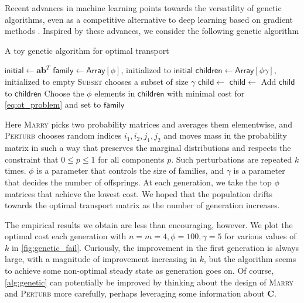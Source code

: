 \documentclass{article}
\renewcommand{\b}{\mathbf}
\theoremstyle{definition}
\theoremstyle{remark}
\begin{document}
Recent advances in machine learning points towards the versatility of genetic
 algorithms, even as a competitive alternative to deep learning based on
 gradient methods \cite{such2017deep}. Inspired by these advances, we consider
 the following genetic algorithm

\begin{algorithm}
\caption{A toy genetic algorithm for optimal transport}
\label{alg:genetic}

  \begin{algorithmic}
\Function{GeneticOT}{$\phi, \gamma, k, \b a, \b b, T$}
\State $\mathsf{initial} \gets \b a \b b^T$
\State $\mathsf{family} \gets \mathsf{Array}[\phi]$, initialized to $
\mathsf{initial}$
\State $\mathsf{children} \gets \mathsf{Array}[\phi\gamma]$, initialized to
 empty
       \Comment
{\textsc{Subset} chooses a subset of size $\gamma$}
\State $\mathsf{child} \gets$ 
\State $\mathsf{child} \gets$ 
\State Add $\mathsf{child}$ to $\mathsf{children}$
\EndFor
\EndFor
\State Choose the $\phi$ elements in $\mathsf{children}$ with minimal cost for
 \eqref{eq:ot_problem} and set to $\mathsf{family}$
\EndFor
\State{}
\EndFunction
  \end{algorithmic}
\end{algorithm}
Here \textsc{Marry} picks two probability matrices and averages them
 elementwise, and \textsc{Perturb} chooses random indices $i_1,i_2, j_1,j_2$ and
 moves mass in the probability matrix in such a way that preserves the marginal
 distributions and respects the constraint that $0\le p \le 1$ for all
 components $p$. Such perturbations are repeated $k$ times. $\phi$ is a
 parameter that controls the size of families, and $\gamma$ is a parameter that
 decides the number of offsprings. At each generation, we take the top $\phi$
 matrices that achieve the lowest cost. We hoped that the population drifts
 towards the optimal transport matrix as the number of generation increases.

The empirical results we obtain are less than encouraging, however. We plot the
 optimal cost each generation with $n = m = 4, \phi=100, \gamma =5$ for various
 values of $k$ in \cref{fig:genetic_fail}. Curiously, the improvement in the
 first generation is always large, with a magnitude of improvement increasing
 in $k$, but the algorithm seems to achieve some non-optimal steady state as
 generation goes on. Of course, \cref{alg:genetic} can potentially be improved
 by thinking about the design of \textsc{Marry} and \textsc{Perturb} more
 carefully, perhaps leveraging some information about $\b C$. 
\end{document}
